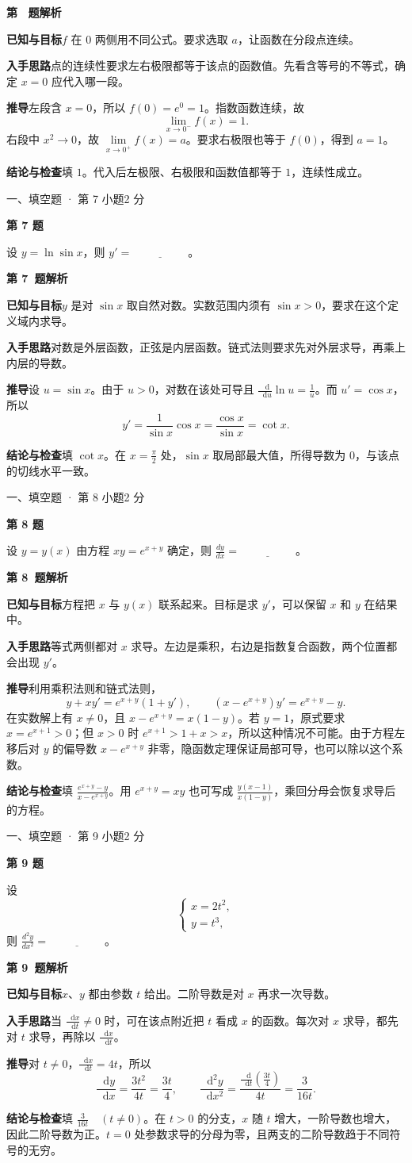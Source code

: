 \documentclass[UTF8,zihao=-4,fontset=fandol]{ctexart}
\newcommand{\dd}{\mathop{}\!\mathrm{d}}
\newcommand{\blank}{\underline{\hspace{5em}}}
\newcommand{\Question}[4]{%
  \clearpage
  \def\CurrentNumber{#1}%
  \pdfbookmark[1]{第 #1 题}{q#1}%
  {\small #2 · 第 #3 小题\hfill #4 分}\par\medskip
  {\Large\bfseries 第 #1 题}\par\medskip
  \fontsize{14}{22}\selectfont
}
\newcommand{\Solution}{%
  \clearpage
  \fontsize{12}{18}\selectfont
  {\large\bfseries 第 \CurrentNumber\ 题解析}\par\smallskip
}
\newcommand{\Known}{\par\textbf{已知与目标}\quad}
\newcommand{\Method}{\par\textbf{入手思路}\quad}
\newcommand{\Derive}{\par\textbf{推导}\quad}
\newcommand{\Verify}{\par\textbf{结论与检查}\quad}
\begin{document}
\Solution
\Known $f$ 在 $0$ 两侧用不同公式。要求选取 $a$，让函数在分段点连续。
\Method 点的连续性要求左右极限都等于该点的函数值。先看含等号的不等式，确定 $x=0$ 应代入哪一段。
\Derive 左段含 $x=0$，所以 $f(0)=e^0=1$。指数函数连续，故
\[
\lim\limits_{x\to0^-}f(x)=1.
\]
右段中 $x^2\to0$，故 $\lim\limits_{x\to0^+}f(x)=a$。要求右极限也等于 $f(0)$，得到 $a=1$。
\Verify 填 $\boxed{1}$。代入后左极限、右极限和函数值都等于 $1$，连续性成立。

\Question{7}{一、填空题}{7}{2}
设 $y=\ln\sin x$，则 $y'=\blank$。

\Solution
\Known $y$ 是对 $\sin x$ 取自然对数。实数范围内须有 $\sin x>0$，要求在这个定义域内求导。
\Method 对数是外层函数，正弦是内层函数。链式法则要求先对外层求导，再乘上内层的导数。
\Derive 设 $u=\sin x$。由于 $u>0$，对数在该处可导且 $\frac{\dd}{\dd u}\ln u=\frac{1}{u}$。而 $u'=\cos x$，所以
\[
y'=\frac{1}{\sin x}\cos x=\frac{\cos x}{\sin x}=\cot x.
\]
\Verify 填 $\boxed{\cot x}$。在 $x=\frac{\pi}{2}$ 处，$\sin x$ 取局部最大值，所得导数为 $0$，与该点的切线水平一致。

\Question{8}{一、填空题}{8}{2}
设 $y=y(x)$ 由方程 $xy=e^{x+y}$ 确定，则 $\frac{dy}{dx}=\blank$。

\Solution
\Known 方程把 $x$ 与 $y(x)$ 联系起来。目标是求 $y'$，可以保留 $x$ 和 $y$ 在结果中。
\Method 等式两侧都对 $x$ 求导。左边是乘积，右边是指数复合函数，两个位置都会出现 $y'$。
\Derive 利用乘积法则和链式法则，
\[
y+xy'=e^{x+y}(1+y'),
\qquad
(x-e^{x+y})y'=e^{x+y}-y.
\]
在实数解上有 $x\ne0$，且 $x-e^{x+y}=x(1-y)$。若 $y=1$，原式要求 $x=e^{x+1}>0$；但 $x>0$ 时 $e^{x+1}>1+x>x$，所以这种情况不可能。由于方程左移后对 $y$ 的偏导数 $x-e^{x+y}$ 非零，隐函数定理保证局部可导，也可以除以这个系数。
\Verify 填 $\boxed{\frac{e^{x+y}-y}{x-e^{x+y}}}$。用 $e^{x+y}=xy$ 也可写成 $\frac{y(x-1)}{x(1-y)}$，乘回分母会恢复求导后的方程。

\Question{9}{一、填空题}{9}{2}
设
\[
\begin{cases}
x=2t^2,\\
y=t^3,
\end{cases}
\]
则 $\frac{d^2y}{dx^2}=\blank$。

\Solution
\Known $x$、$y$ 都由参数 $t$ 给出。二阶导数是对 $x$ 再求一次导数。
\Method 当 $\frac{\dd x}{\dd t}\ne0$ 时，可在该点附近把 $t$ 看成 $x$ 的函数。每次对 $x$ 求导，都先对 $t$ 求导，再除以 $\frac{\dd x}{\dd t}$。
\Derive 对 $t\ne0$，$\frac{\dd x}{\dd t}=4t$，所以
\[
\frac{\dd y}{\dd x}=\frac{3t^2}{4t}=\frac{3t}{4},
\qquad
\frac{\dd^2 y}{\dd x^2}=\frac{\frac{\dd}{\dd t}(\frac{3t}{4})}{4t}
=\frac{3}{16t}.
\]
\Verify 填 $\boxed{\frac{3}{16t}\quad(t\ne0)}$。在 $t>0$ 的分支，$x$ 随 $t$ 增大，一阶导数也增大，因此二阶导数为正。$t=0$ 处参数求导的分母为零，且两支的二阶导数趋于不同符号的无穷。
\end{document}
